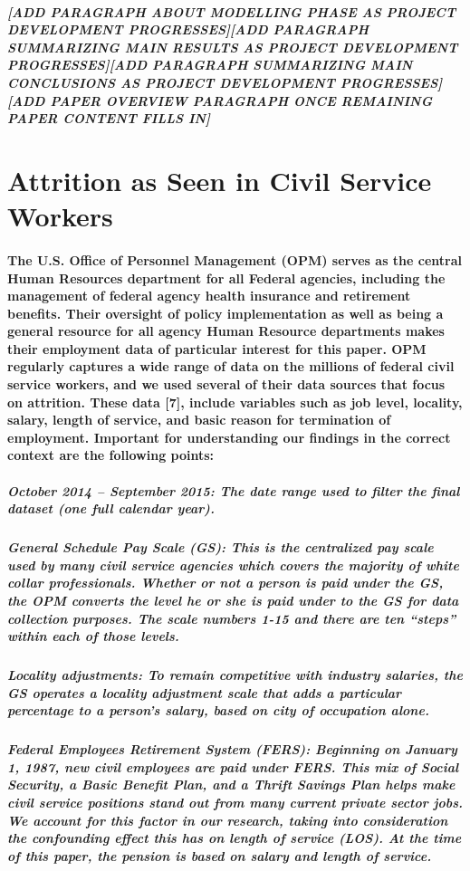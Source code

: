 \documentclass{article}
\begin{document}
\subparagraph{[ADD PARAGRAPH ABOUT MODELLING PHASE AS PROJECT DEVELOPMENT PROGRESSES][ADD PARAGRAPH SUMMARIZING MAIN RESULTS AS PROJECT DEVELOPMENT PROGRESSES][ADD PARAGRAPH SUMMARIZING MAIN CONCLUSIONS AS PROJECT DEVELOPMENT PROGRESSES][ADD PAPER OVERVIEW PARAGRAPH ONCE REMAINING PAPER CONTENT FILLS IN]}
  
\section{Attrition as Seen in Civil Service Workers}

\paragraph{The U.S. Office of Personnel Management (OPM) serves as the central Human Resources department for all Federal agencies, including the management of federal agency health insurance and retirement benefits. Their oversight of policy implementation as well as being a general resource for all agency Human Resource departments makes their employment data of particular interest for this paper. OPM regularly captures a wide range of data on the millions of federal civil service workers, and we used several of their data sources that focus on attrition. These data [7], include variables such as job level, locality, salary, length of service, and basic reason for termination of employment. Important for understanding our findings in the correct context are the following points:}

\subparagraph{October 2014 – September 2015: The date range used to filter the final dataset (one full calendar year).}

\subparagraph{General Schedule Pay Scale (GS): This is the centralized pay scale used by many civil service agencies which covers the majority of white collar professionals. Whether or not a person is paid under the GS, the OPM converts the level he or she is paid under to the GS for data collection purposes. The scale numbers 1-15 and there are ten “steps” within each of those levels.}

\subparagraph{Locality adjustments: To remain competitive with industry salaries, the GS operates a locality adjustment scale that adds a particular percentage to a person’s salary, based on city of occupation alone.}

\subparagraph{Federal Employees Retirement System (FERS): Beginning on January 1, 1987, new civil employees are paid under FERS. This mix of Social Security, a Basic Benefit Plan, and a Thrift Savings Plan helps make civil service positions stand out from many current private sector jobs. We account for this factor in our research, taking into consideration the confounding effect this has on length of service (LOS). At the time of this paper, the pension is based on salary and length of service.}
\end{document}
